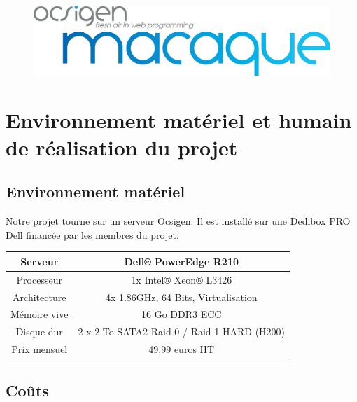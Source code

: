 \documentclass{life-fr}
\begin{document}
\begin{figure}[H]
  \begin{center}
    \includegraphics[width=13cm]{img/macaque.png}
  \end{center}
\end{figure}


\chapter{Environnement matériel et humain de réalisation du projet}

\section{Environnement matériel}

Notre projet tourne sur un serveur Ocsigen. Il est installé sur une Dedibox PRO Dell financée par les membres du projet.

\vspace{20pt}

\begin{tabular}{|c|c|}
  \hline
   Serveur & Dell® PowerEdge R210\\
  \hline
  Processeur & 1x Intel® Xeon® L3426\\
  \hline
  Architecture & 4x 1.86GHz, 64 Bits, Virtualisation\\
  \hline
  Mémoire vive & 16 Go DDR3 ECC\\
  \hline
  Disque dur & 2 x 2 To SATA2 Raid 0 / Raid 1 HARD (H200)\\
  \hline
  Prix mensuel & 49,99 euros HT\\
  \hline
\end{tabular}

\vspace{20pt}

\section{Coûts}
\end{document}
